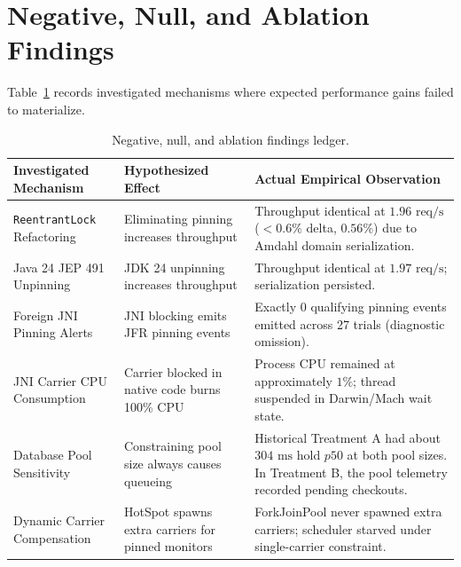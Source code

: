 \section{Negative, Null, and Ablation Findings}
\label{sec:negative-findings}

Table~\ref{tab:negative-findings} records investigated mechanisms where expected performance gains failed to materialize.

\begin{table}[htbp]
  \centering
  \caption{Negative, null, and ablation findings ledger.}
  \label{tab:negative-findings}
  \begin{tabularx}{\textwidth}{@{}>{\raggedright\arraybackslash}p{}>{\raggedright\arraybackslash}p{}>{\raggedright\arraybackslash}X@{}}
    \toprule
    \textbf{Investigated Mechanism} & \textbf{Hypothesized Effect} & \textbf{Actual Empirical Observation} \\
    \midrule
    \texttt{ReentrantLock} Refactoring & Eliminating pinning increases throughput & Throughput identical at $1.96\text{ req/s}$ ($<0.6\%$ delta, $0.56\%$) due to Amdahl domain serialization. \\
    \addlinespace
    Java 24 JEP 491 Unpinning & JDK 24 unpinning increases throughput & Throughput identical at $1.97\text{ req/s}$; serialization persisted. \\
    \addlinespace
    Foreign JNI Pinning Alerts & JNI blocking emits JFR pinning events & Exactly 0 qualifying pinning events emitted across 27 trials (diagnostic omission). \\
    \addlinespace
    JNI Carrier CPU Consumption & Carrier blocked in native code burns 100\% CPU & Process CPU remained at approximately $1\%$; thread suspended in Darwin/Mach wait state. \\
    \addlinespace
    Database Pool Sensitivity & Constraining pool size always causes queueing & Historical Treatment A had about $304\text{ ms}$ hold $p50$ at both pool sizes. In Treatment B, the pool telemetry recorded pending checkouts. \\
    \addlinespace
    Dynamic Carrier Compensation & HotSpot spawns extra carriers for pinned monitors & ForkJoinPool never spawned extra carriers; scheduler starved under single-carrier constraint. \\
    \bottomrule
  \end{tabularx}
\end{table}
